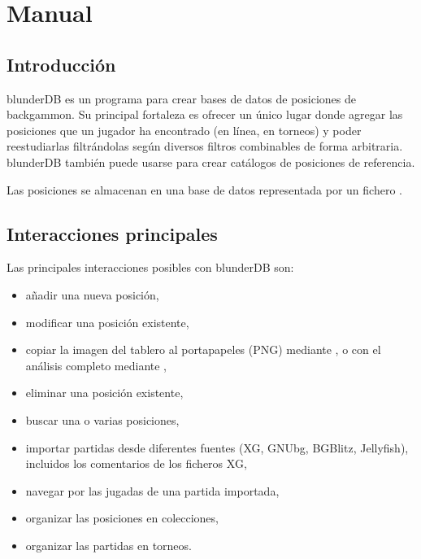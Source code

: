 \documentclass[letterpaper,10pt,spanish]{sphinxmanual}
\begin{document}
\sphinxstepscope


\section{Manual}
\label{\detokenize{manuel:manuel}}\label{\detokenize{manuel:id1}}\label{\detokenize{manuel::doc}}

\subsection{Introducción}
\label{\detokenize{manuel:introduction}}
\sphinxAtStartPar
blunderDB es un programa para crear bases de datos de posiciones de backgammon. Su principal fortaleza es ofrecer un único lugar donde agregar las posiciones que un jugador ha encontrado (en línea, en torneos) y poder reestudiarlas filtrándolas según diversos filtros combinables de forma arbitraria. blunderDB también puede usarse para crear catálogos de posiciones de referencia.

\sphinxAtStartPar
Las posiciones se almacenan en una base de datos representada por un fichero .


\subsection{Interacciones principales}
\label{\detokenize{manuel:interactions-principales}}
\sphinxAtStartPar
Las principales interacciones posibles con blunderDB son:
\begin{itemize}
\item {} 
\sphinxAtStartPar
añadir una nueva posición,

\item {} 
\sphinxAtStartPar
modificar una posición existente,

\item {} 
\sphinxAtStartPar
copiar la imagen del tablero al portapapeles (PNG) mediante , o con el análisis completo mediante ,

\item {} 
\sphinxAtStartPar
eliminar una posición existente,

\item {} 
\sphinxAtStartPar
buscar una o varias posiciones,

\item {} 
\sphinxAtStartPar
importar partidas desde diferentes fuentes (XG, GNUbg, BGBlitz, Jellyfish), incluidos los comentarios de los ficheros XG,

\item {} 
\sphinxAtStartPar
navegar por las jugadas de una partida importada,

\item {} 
\sphinxAtStartPar
organizar las posiciones en colecciones,

\item {} 
\sphinxAtStartPar
organizar las partidas en torneos.

\end{itemize}
\end{document}
